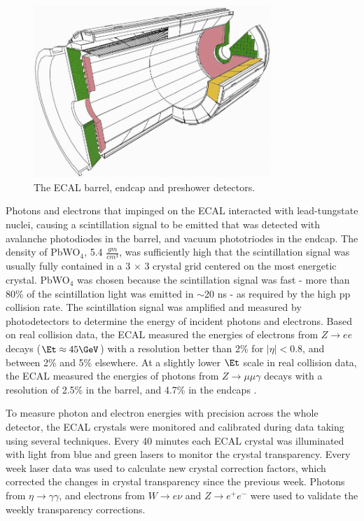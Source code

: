 \begin{figure}[ht]
	\centering
	\includegraphics[width=0.8\textwidth]{figures/ecalBarrelEndcapAndPreshower.png}
	\caption{The ECAL barrel, endcap and preshower detectors.}
	\label{fig:ecalEBEEandES}
\end{figure}

Photons and electrons that impinged on the ECAL interacted with lead-tungstate nuclei, causing a scintillation 
signal to be emitted that was detected with avalanche photodiodes in the barrel, and vacuum phototriodes in the 
endcap.  The density of PbWO$_{4}$, 5.4 $\frac{gm}{cm^{3}}$, 
was sufficiently high that the scintillation signal was usually fully contained in a 3 $\times$ 3 crystal 
grid centered on the most energetic crystal.  PbWO$_{4}$ was chosen because the scintillation signal was fast - 
more than 80\% of the scintillation light was emitted in $\sim$20 ns - as required by the high pp collision rate.  
The scintillation signal was amplified and measured by photodetectors to determine the energy of incident 
photons and electrons.  Based on real collision data, the ECAL measured the energies of electrons from $Z \rightarrow ee$ 
decays ($\Et \approx 45 \GeV$) with a resolution better than 2\% for $|\eta| < 0.8$, and between 2\% and 5\% elsewhere.  
At a slightly lower $\Et$ scale in real collision data, the ECAL measured the energies of photons from $Z \rightarrow \mu\mu\gamma$ 
decays with a resolution of 2.5\% in the barrel, and 4.7\% in the endcaps \cite{ecalPerformanceInCollisions}.

To measure photon and electron energies with precision across the whole detector, the ECAL crystals were monitored and calibrated 
during data taking using several techniques.  Every 40 minutes each ECAL crystal was illuminated 
with light from blue and green lasers to monitor the crystal transparency.  Every week laser data 
was used to calculate new crystal correction factors, which corrected the changes in crystal transparency 
since the previous week.  Photons from $\eta \rightarrow \gamma\gamma$, and electrons from 
$W \rightarrow e\nu$ and $Z \rightarrow e^{+}e^{-}$ were used to validate the weekly transparency corrections.

